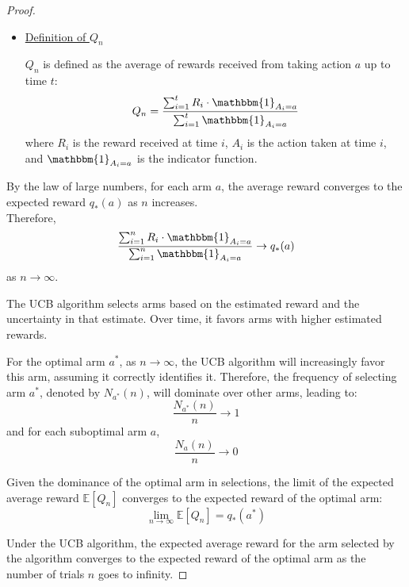 \documentclass{article}
\begin{document}
\begin{enumerate}[a)]
\begin{proof}
\begin{itemize}
            \item \underline{Definition of $Q_n$}\par 
            $Q_n$ is defined as the average of rewards received from taking action $a$ up to time $t$:
            \[ Q_n = \frac{\sum_{i=1}^{t} R_i \cdot \mathbbm{1}_{A_i=a}}{\sum_{i=1}^{t} \mathbbm{1}_{A_i=a}} \]
            where $R_i$ is the reward received at time $i$, $A_i$ is the action taken at time $i$, and $\mathbbm{1}_{A_i=a}$ is the indicator function.
        \end{itemize}

        By the law of large numbers, for each arm $a$, the average reward converges to the expected reward $q_{*}(a)$ as $n$ increases.\\

        Therefore,
        \[ \frac{\sum_{i=1}^{n} R_i \cdot \mathbbm{1}_{A_i=a}}{\sum_{i=1}^{n} \mathbbm{1}_{A_i=a}} \to q_{*}(a) \]
        as $n \to \infty$.
        
        The UCB algorithm selects arms based on the estimated reward and the uncertainty in that estimate. Over time, it favors arms with higher estimated rewards.
        

        For the optimal arm $a^*$, as $n \to \infty$, the UCB algorithm will increasingly favor this arm, assuming it correctly identifies it. Therefore, the frequency of selecting arm $a^*$, denoted by $N_{a^*}(n)$, will dominate over other arms, leading to:
        \[ \frac{N_{a^*}(n)}{n} \to 1 \]
        and for each suboptimal arm $a$,
        \[ \frac{N_a(n)}{n} \to 0 \]
        

        Given the dominance of the optimal arm in selections, the limit of the expected average reward $\mathbb{E}[Q_n]$ converges to the expected reward of the optimal arm:
        \[ \lim_{n \to \infty} \mathbb{E}[Q_n] = q_{*}(a^*) \]
        

        Under the UCB algorithm, the expected average reward for the arm selected by the algorithm converges to the expected reward of the optimal arm as the number of trials $n$ goes to infinity.\par 
    \end{proof}
    
\end{enumerate}
\end{document}
